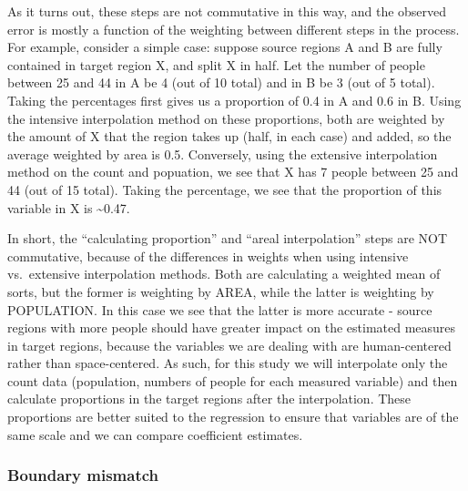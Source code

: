 \documentclass[12pt,twoside]{reedthesis}
\theoremstyle{definition}
\theoremstyle{definition}
\theoremstyle{definition}
\theoremstyle{remark}
\begin{document}
As it turns out, these steps are not commutative in this way, and the
observed error is mostly a function of the weighting between different
steps in the process. For example, consider a simple case: suppose
source regions A and B are fully contained in target region X, and split
X in half. Let the number of people between 25 and 44 in A be 4 (out of
10 total) and in B be 3 (out of 5 total). Taking the percentages first
gives us a proportion of 0.4 in A and 0.6 in B. Using the intensive
interpolation method on these proportions, both are weighted by the
amount of X that the region takes up (half, in each case) and added, so
the average weighted by area is 0.5. Conversely, using the extensive
interpolation method on the count and popuation, we see that X has 7
people between 25 and 44 (out of 15 total). Taking the percentage, we
see that the proportion of this variable in X is \textasciitilde{}0.47.

In short, the ``calculating proportion'' and ``areal interpolation''
steps are NOT commutative, because of the differences in weights when
using intensive vs.~extensive interpolation methods. Both are
calculating a weighted mean of sorts, but the former is weighting by
AREA, while the latter is weighting by POPULATION. In this case we see
that the latter is more accurate - source regions with more people
should have greater impact on the estimated measures in target regions,
because the variables we are dealing with are human-centered rather than
space-centered. As such, for this study we will interpolate only the
count data (population, numbers of people for each measured variable)
and then calculate proportions in the target regions after the
interpolation. These proportions are better suited to the regression to
ensure that variables are of the same scale and we can compare
coefficient estimates.

\hypertarget{boundary-mismatch}{%
\subsubsection{Boundary mismatch}\label{boundary-mismatch}}
\end{document}
